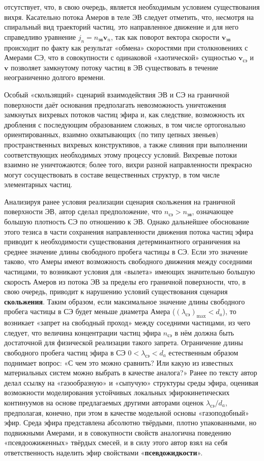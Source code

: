 отсутствует, что, в свою очередь, является необходимым условием существования вихря. Касательно потока Амеров в теле ЭВ следует отметить, что, несмотря на спиральный вид траекторий частиц, это направленное движение и для него справедливо уравнение \(j_n = n_{\text{эв}} \mathbf{v}_n\), так как поворот вектора скорости \(\mathbf{v}_{\text{эв}}\) происходит по факту как результат «обмена» скоростями при столкновениях с Амерами СЭ, что в совокупности с одинаковой «хаотической» сущностью \(\mathbf{v}_{\text{сэ}}\) и \(\mathbf{v}\) позволяет замкнутому потоку частиц в ЭВ существовать в течение неограниченно долгого времени.

Особый «скользящий» сценарий взаимодействия ЭВ и СЭ на граничной поверхности даёт основания предполагать невозможность уничтожения замкнутых вихревых потоков частиц эфира и, как следствие, возможность их дробления с последующим образованием сложных, в том числе ортогонально ориентированных, взаимно охватывающих (по типу цепных звеньев) пространственных вихревых конструктивов, а также слияния при выполнении соответствующих необходимых этому процессу условий. Вихревые потоки взаимно не уничтожаются; более того, вихри разной направленности прекрасно могут сосуществовать в составе вещественных структур, в том числе элементарных частиц.

Анализируя ранее условия реализации сценария скольжения на граничной поверхности ЭВ, автор сделал предположение, что \(n_{\text{сэ}} > n_{\text{эв}}\), означающее большую плотность СЭ по отношению к ЭВ. Однако дальнейшее обоснование этого тезиса в части сохранения направленности движения потока частиц эфира приводит к необходимости существования детерминантного ограничения на среднее значение длины свободного пробега частицы в СЭ. Если это значение таково, что Амеры имеют возможность свободного движения между соседними частицами, то возникают условия для «вылета» имеющих значительно большую скорость Амеров из потока ЭВ за пределы его граничной поверхности, что, в свою очередь, приводит к нарушению условий существования сценария \textbf{скольжения}. Таким образом, если максимальное значение длины свободного пробега частицы в СЭ будет меньше диаметра Амера (\((\lambda_{\text{сэ}})_{\max} < d_a\)), то возникает «запрет на свободный проход» между соседними частицами, из чего следует, что величина концентрации частиц эфира \(n_{\text{сэ}}\) в нём должна быть достаточной для физической реализации такого запрета. Ограничение длины свободного пробега частиц эфира в СЭ \(0 < \lambda_{\text{сэ}} < d_a\) естественным образом поднимает вопрос: «С чем это можно сравнить? Или какую из известных материальных систем можно выбрать в качестве аналога?» Ранее по тексту автор делал ссылку на «газообразную» и «сыпучую» структуры среды эфира, оценивая возможности моделирования устойчивых локальных эфирокинетических континуумов на основе предлагаемых другими авторами оценок \(\lambda_{\text{сэ}}/d_a\), предполагая, конечно, при этом в качестве модельной основы «газоподобный» эфир. Среда эфира представлена абсолютно твёрдыми, плотно упакованными, но подвижными Амерами, и в совокупности свойств аналогична поведению «псевдоожиженных» твёрдых смесей, и в силу этого автор взял на себя ответственность наделить эфир свойствами «\textbf{псевдожидкости}».

